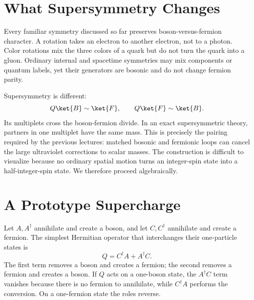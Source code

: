 \section{What Supersymmetry Changes}

Every familiar symmetry discussed so far preserves boson-versus-fermion character. A rotation takes an electron to another electron, not to a photon. Color rotations mix the three colors of a quark but do not turn the quark into a gluon. Ordinary internal and spacetime symmetries may mix components or quantum labels, yet their generators are bosonic and do not change fermion parity.

Supersymmetry is different:
\begin{equation}
Q\ket{B}\sim\ket{F},
\qquad
Q\ket{F}\sim\ket{B}.
\end{equation}
Its multiplets cross the boson-fermion divide. In an exact supersymmetric theory, partners in one multiplet have the same mass. This is precisely the pairing required by the previous lectures: matched bosonic and fermionic loops can cancel the large ultraviolet corrections to scalar masses. The construction is difficult to visualize because no ordinary spatial motion turns an integer-spin state into a half-integer-spin state. We therefore proceed algebraically.

\section{A Prototype Supercharge}

Let \(A,A^\dagger\) annihilate and create a boson, and let \(C,C^\dagger\) annihilate and create a fermion. The simplest Hermitian operator that interchanges their one-particle states is
\begin{equation}
Q=C^\dagger A+A^\dagger C.
\end{equation}
The first term removes a boson and creates a fermion; the second removes a fermion and creates a boson. If \(Q\) acts on a one-boson state, the \(A^\dagger C\) term vanishes because there is no fermion to annihilate, while \(C^\dagger A\) performs the conversion. On a one-fermion state the roles reverse.

\begin{classroomqa}
\end{classroomqa}

